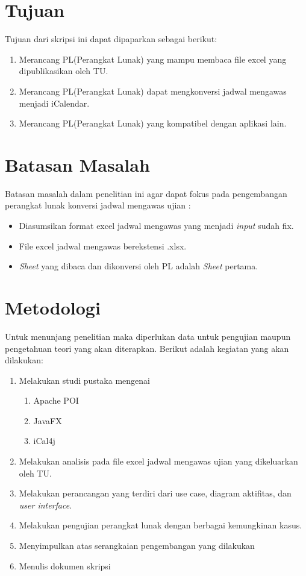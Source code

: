 \section{Tujuan}
\label{sec:tujuan}
Tujuan dari skripsi ini dapat dipaparkan sebagai berikut:
\begin{enumerate}
	\item Merancang PL(Perangkat Lunak) yang mampu membaca file excel yang dipublikasikan oleh TU.
	\item Merancang PL(Perangkat Lunak) dapat mengkonversi jadwal mengawas menjadi iCalendar.
	\item Merancang PL(Perangkat Lunak) yang kompatibel dengan aplikasi lain.
\end{enumerate}

\section{Batasan Masalah}
\label{sec:batasan}
Batasan masalah dalam penelitian ini agar dapat fokus pada pengembangan perangkat lunak konversi jadwal mengawas ujian :
\begin{itemize}
	\item Diasumsikan format excel jadwal mengawas yang menjadi \textit{input} sudah fix.
	\item File excel jadwal mengawas berekstensi .xlsx.
	\item \textit{Sheet} yang dibaca dan dikonversi oleh PL adalah \textit{Sheet} pertama.
\end{itemize}

\section{Metodologi}
\label{sec:metlit}
Untuk menunjang penelitian maka diperlukan data untuk pengujian maupun pengetahuan teori yang akan diterapkan. Berikut adalah kegiatan yang akan dilakukan:
\begin{enumerate}
		\item Melakukan studi pustaka mengenai
			\begin{enumerate}
				\item Apache POI
				\item JavaFX
				\item iCal4j
			\end{enumerate}
		\item Melakukan analisis pada file excel jadwal mengawas ujian yang dikeluarkan oleh TU.
		\item Melakukan perancangan yang terdiri dari use case, diagram aktifitas, dan \textit{user interface}.
		\item Melakukan pengujian perangkat lunak dengan berbagai kemungkinan kasus.
		\item Menyimpulkan atas serangkaian pengembangan yang dilakukan
		\item Menulis dokumen skripsi
	\end{enumerate}

